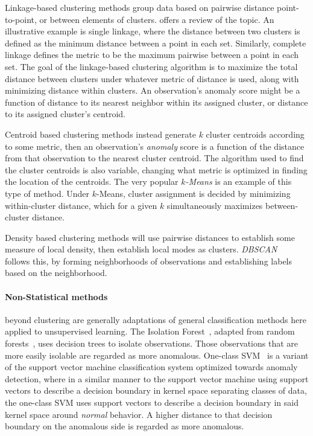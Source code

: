 Linkage-based clustering methods group data based on pairwise distance 
    point-to-point, or between elements of clusters.  \cite{ackerman2010} offers
    a review of the topic.  An illustrative example is single linkage, where 
    the distance between two clusters is defined as the minimum distance 
    between a point in each set.   Similarly, complete linkage defines the 
    metric to be the maximum pairwise between a point in each set.  The goal of 
    the linkage-based clustering algorithm is to maximize the total distance 
    between clusters under whatever metric of distance is used, along with 
    minimizing distance within clusters.  An observation's anomaly score might 
    be a function of distance to its nearest neighbor within its assigned 
    cluster, or distance to its assigned cluster's centroid.

Centroid based clustering methods instead generate $k$ cluster centroids 
    according to some metric, then an observation's \emph{anomaly} score is a 
    function of the distance from that observation to the nearest cluster 
    centroid.  The algorithm used to find the cluster centroids is also 
    variable, changing what metric is optimized in finding the location of the
    centroids.  The very popular \emph{$k$-Means} \citep{hartigan1979} is an 
    example of this type of method.  Under $k$-Means, cluster assignment is 
    decided by minimizing within-cluster distance, which for a given $k$ 
    simultaneously maximizes between-cluster distance.

Density based clustering methods will use pairwise distances to establish some 
    measure of local density, then establish local modes as clusters.
    \emph{DBSCAN}~\citep{ester1996} follows this, by forming neighborhoods of 
    observations and establishing labels based on the neighborhood.

\paragraph{Non-Statistical methods} beyond clustering are generally adaptations 
    of general classification methods here applied to unsupervised learning.  
    The Isolation Forest~\citep{liu2000}, adapted from random 
    forests~\citep{breiman2001}, uses decision trees to isolate observations.
    Those observations that are more easily isolable are regarded as more 
    anomalous.  One-class SVM~\citep{chang2011} is a variant of the support 
    vector machine classification system optimized towards anomaly detection, 
    where in a similar manner to the support vector machine using support 
    vectors to describe a decision boundary in kernel space separating classes 
    of data, the one-class SVM uses support vectors to describe a decision 
    boundary in said kernel space around \emph{normal} behavior. A higher 
    distance to that decision boundary on the anomalous side is regarded as 
    more anomalous.


